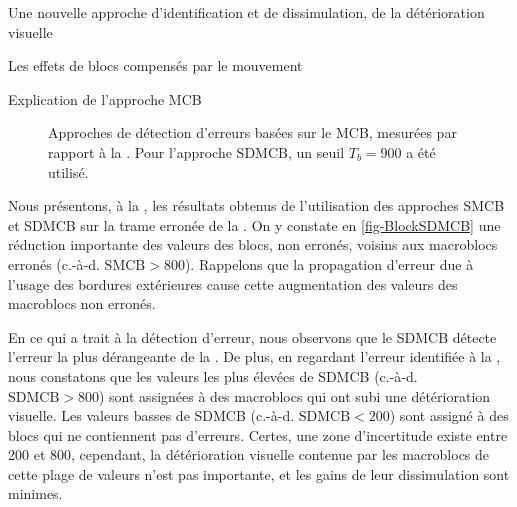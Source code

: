\begin{chapter}{Une nouvelle approche d'identification et de dissimulation, de
la détérioration visuelle}
\begin{section}{Les effets de blocs compensés par le mouvement}
\begin{subsection}{Explication de l'approche MCB}
\begin{figure}
	\caption[Approches de détection d'erreurs basées sur le MCB]{Approches de
détection d'erreurs basées sur le MCB, mesurées par rapport à la
. Pour l'approche SDMCB, un seuil $T_b=900$ a été utilisé.}
	\label{fig-BlockMCB}
\end{figure}


Nous présentons, à la , les résultats obtenus de l'utilisation
des approches SMCB et SDMCB sur la trame erronée de la 
. On y constate en \ref{fig-BlockSDMCB} une réduction
importante des valeurs des blocs, non erronés, voisins aux macroblocs erronés (c.-à-d. $\text{SMCB} >
800$). Rappelons que la propagation d'erreur due à l'usage des bordures
extérieures cause cette augmentation des valeurs des macroblocs non erronés.

En ce qui a trait à la détection d'erreur, nous observons que le SDMCB détecte
l'erreur la plus dérangeante de la  . De
plus, en regardant l'erreur identifiée à la 
, nous constatons que les valeurs les plus élevées de
SDMCB (c.-à-d. $\text{SDMCB} > 800$) sont assignées à des macroblocs qui ont
subi une détérioration visuelle. Les valeurs basses de SDMCB (c.-à-d.
$\text{SDMCB} < 200$) sont assigné à des blocs qui ne contiennent pas d'erreurs.
Certes, une zone d'incertitude existe entre 200 et 800, cependant, la
détérioration visuelle contenue par les macroblocs de cette plage de valeurs
n'est pas importante, et les gains de leur dissimulation sont minimes.


\end{subsection}
\end{section}
\end{chapter}
